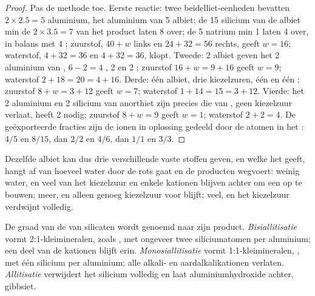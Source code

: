 \begin{proof}
Pas de methode toe. Eerste reactie: twee beidelliet-eenheden bevatten $2\times2.5 = 5$
aluminium, het aluminium van 5 albiet; de 15 silicium van de albiet min de
$2\times3.5 = 7$ van het product laten 8  over; de 5 natrium min 1 laten
4  over, in balans met 4 ; zuurstof, $40 + w$ links en $24 + 32 =
56$ rechts, geeft $w = 16$; waterstof, $4 + 32 = 36$ en $4 + 32 = 36$,
klopt. Tweede: 2 albiet geven het 2 aluminium van , $6 - 2 = 4$
, 2  en 2 ; zuurstof $16 + w = 9 + 16$ geeft $w = 9$;
waterstof $2 + 18 = 20 = 4 + 16$. Derde: één albiet, drie kiezelzuren, één
 en één ; zuurstof $8 + w = 3 + 12$ geeft $w = 7$; waterstof
$1 + 14 = 15 = 3 + 12$. Vierde: het 2 aluminium en 2 silicium van anorthiet zijn
precies die van , geen kiezelzuur verlaat,  heeft 2  nodig;
zuurstof $8 + w = 9$ geeft $w = 1$; waterstof $2 + 2 = 4$. De geëxporteerde fracties
zijn de ionen in oplossing gedeeld door de atomen in het : $4/5$ en $8/15$, dan
$2/2$ en $4/6$, dan $1/1$ en $3/3$.
\end{proof}

Dezelfde albiet kan dus drie verschillende vaste stoffen geven, en welke het geeft, hangt af van hoeveel water door de rots gaat en de producten wegvoert: weinig water, en veel van het kiezelzuur en enkele kationen blijven achter om een  op te bouwen; meer, en alleen genoeg kiezelzuur voor  blijft; veel, en het kiezelzuur verdwijnt volledig.

\begin{definition}\label{def:b1:weathering-clays:hydrolysis-degree}
De graad van de  van silicaten wordt genoemd naar zijn product. \emph{Bisiallitisatie} vormt 2:1-kleimineralen, zoals , met ongeveer twee siliciumatomen per aluminium; een deel van de kationen blijft erin. \emph{Monosiallitisatie} vormt 1:1-kleimineralen, , met één silicium per aluminium; alle alkali- en aardalkalikationen verlaten. \emph{Allitisatie} verwijdert het silicium volledig en laat aluminiumhydroxide achter, gibbsiet.
\end{definition}

